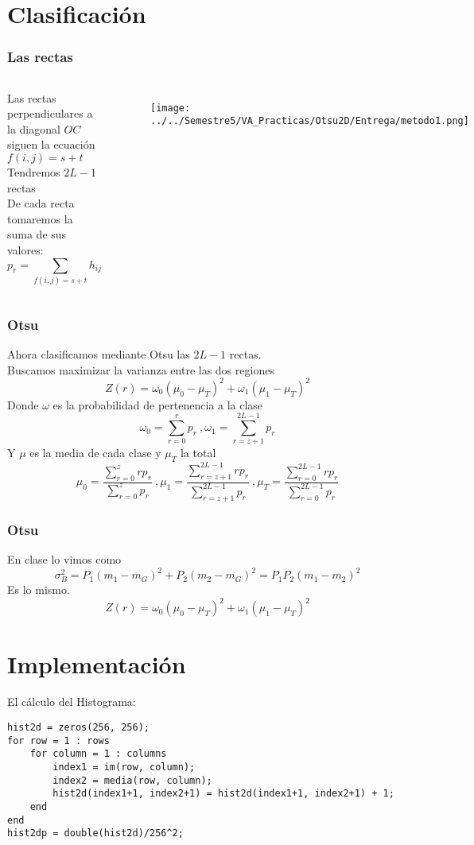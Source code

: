 \documentclass{beamer}
\begin{document}
\section{Clasificación}
\begin{frame}
\frametitle{Las rectas}
\begin{columns}[t] %
Las rectas perpendiculares a la diagonal $OC$ siguen la ecuación $f(i,j)=s+t$\\
Tendremos $2L-1$ rectas\\
De cada recta tomaremos la suma de sus valores:
$$p_r = \sum_{f(i,j)=s+t}{h_{ij}}$$
\begin{figure}
\texttt{[image: ../../Semestre5/VA\_Practicas/Otsu2D/Entrega/metodo1.png]}
\end{figure}
\end{columns}
\end{frame}

\begin{frame}
\frametitle{Otsu}
Ahora clasificamos mediante Otsu las $2L-1$ rectas.\\
Buscamos maximizar la varianza entre las dos regiones $$Z(r)= \omega_0(\mu_0-\mu_T)^2+\omega_1(\mu_1-\mu_T)^2$$
Donde $\omega$ es la probabilidad de pertenencia a la clase $$\omega_0=\sum_{r=0}^rp_r\ ,\omega_1=\sum_{r=z+1}^{2L-1}p_r$$
Y $\mu$ es la media de cada clase y $\mu_{T}$ la total
$$ \mu_0 = \frac{\sum_{r=0}^zrp_r}{\sum_{r=0}^zp_r}\ , \mu_1 = \frac{\sum_{r=z+1}^{2L-1}rp_r}{\sum_{r=z+1}^{2L-1}p_r}\ , \mu_T = \frac{\sum_{r=0}^{2L-1}rp_r}{\sum_{r=0}^{2L-1}p_r}$$
\end{frame}

\begin{frame}
\frametitle{Otsu}
En clase lo vimos como 
$$\sigma_B^2=P_1(m_1-m_G)^2+P_2(m_2-m_G)^2=P_1P_2(m_1-m_2)^2$$
Es lo mismo.
$$Z(r)= \omega_0(\mu_0-\mu_T)^2+\omega_1(\mu_1-\mu_T)^2$$
\end{frame}

\section{Implementación}

\begin{frame}[fragile]
El cálculo del Histograma:
\begin{lstlisting}
hist2d = zeros(256, 256);   
for row = 1 : rows
    for column = 1 : columns	
        index1 = im(row, column);
        index2 = media(row, column);
        hist2d(index1+1, index2+1) = hist2d(index1+1, index2+1) + 1;
    end
end
hist2dp = double(hist2d)/256^2;
\end{lstlisting}

\end{frame}
\end{document}
